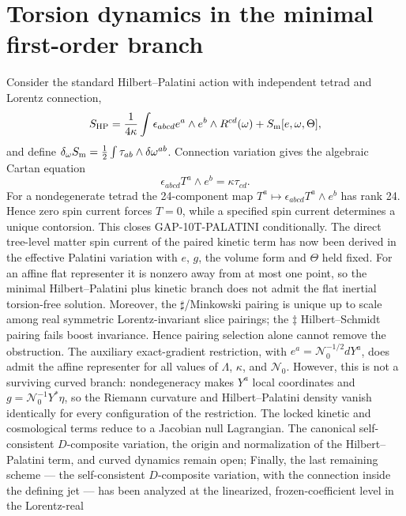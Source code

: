\documentclass[12pt,a4paper]{article}
\theoremstyle{remark}\newtheorem{remark}[definition]{Remark}
\begin{document}
\section{Torsion dynamics in the minimal first-order branch}
Consider the standard Hilbert--Palatini action with independent tetrad and
Lorentz connection,
\begin{equation}
 S_{\rm HP}=\frac1{4\kappa}\int\epsilon_{abcd}
 e^a\wedge e^b\wedge R^{cd}(\omega)+S_{\rm m}[e,\omega,\Theta],
 \label{eq:HP-paper}
\end{equation}
and define
$\delta_\omega S_{\rm m}=\tfrac12\int\tau_{ab}\wedge\delta\omega^{ab}$.
Connection variation gives the algebraic Cartan equation
\begin{equation}
 \boxed{\epsilon_{abcd}T^a\wedge e^b=\kappa\tau_{cd}.}
 \label{eq:Cartan-paper}
\end{equation}
For a nondegenerate tetrad the 24-component map
$T^a\mapsto\epsilon_{abcd}T^a\wedge e^b$ has rank 24.  Hence zero spin current
forces $T=0$, while a specified spin current determines a unique contorsion.
This closes GAP-10T-PALATINI conditionally.  The direct tree-level matter
spin current of the paired kinetic term has now been derived in the effective
Palatini variation with $e$, $g$, the volume form and $\Theta$ held fixed.
For an affine flat representer it is nonzero away from at most one point, so
the minimal Hilbert--Palatini plus kinetic branch does not admit the flat
inertial torsion-free solution.  Moreover, the $\sharp$/Minkowski pairing is
unique up to scale among real symmetric Lorentz-invariant slice pairings; the
$\ddagger$ Hilbert--Schmidt pairing fails boost invariance.  Hence pairing
selection alone cannot remove the obstruction.  The auxiliary exact-gradient restriction, with
$e^a=\mathcal N_0^{-1/2}dY^a$, does admit the affine representer for all
values of $\Lambda$, $\kappa$, and $\mathcal N_0$.  However, this is not a
surviving curved branch: nondegeneracy makes $Y^a$ local coordinates and
$g=\mathcal N_0^{-1}Y^*\eta$, so the Riemann curvature and
Hilbert--Palatini density vanish identically for every configuration of the
restriction.  The locked kinetic and cosmological terms reduce to a Jacobian
null Lagrangian.  The canonical self-consistent $D$-composite variation, the
origin and normalization of the Hilbert--Palatini term, and curved dynamics
remain open; Finally, the last remaining scheme --- the self-consistent $D$-composite
variation, with the connection inside the defining jet --- has been
analyzed at the linearized, frozen-coefficient level in the Lorentz-real
\end{document}
